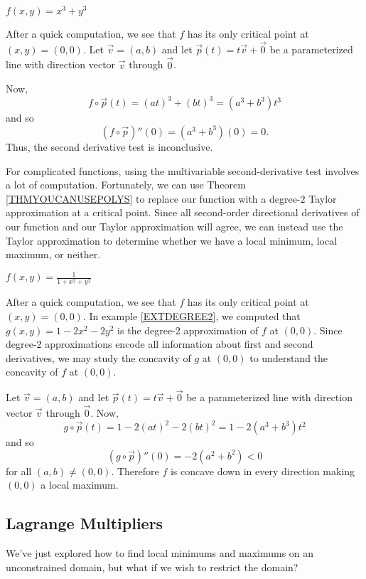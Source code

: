 \begin{example}
	$f(x,y)=x^3+y^3$

	After a quick computation, we see that $f$ has its only critical
	point at $(x,y)=(0,0)$.  Let $\vec v=(a,b)$ and let $\vec p(t) = t\vec v+\vec 0$
	be a parameterized line with direction vector $\vec v$ through $\vec 0$.

	Now,
	\[
		f\circ \vec p(t) = (at)^3+(bt)^3=(a^3+b^3)t^3
	\]
	and so
	\[
		(f\circ \vec p)''(0) = (a^3+b^3)(0) = 0.
	\]
	Thus, the second derivative test is inconclusive.
\end{example}

For complicated functions, using the multivariable second-derivative test
involves a lot of computation.  Fortunately, we can use Theorem \ref{THMYOUCANUSEPOLYS}
to replace our function with a degree-$2$ Taylor approximation at a critical point.  
Since all second-order directional derivatives of our function and our Taylor approximation
will agree, we can instead use the Taylor approximation to determine whether we have a local
minimum, local maximum, or neither. 

\begin{example}
	$f(x,y)=\frac{1}{1+x^2+y^2}$

	After a quick computation, we see that $f$ has its only critical
	point at $(x,y)=(0,0)$.  
	In example \ref{EXTDEGREE2}, we computed that
	$g(x,y)=1-2x^2-2y^2$ is the degree-2 approximation of $f$ at $(0,0)$.  Since
	degree-2 approximations encode all information about first and second derivatives,
	we may study the concavity of $g$ at $(0,0)$ to understand the concavity of $f$ at $(0,0)$.

	Let $\vec v=(a,b)$ and let $\vec p(t) = t\vec v+\vec 0$
	be a parameterized line with direction vector $\vec v$ through $\vec 0$.  Now,
	\[
		g\circ \vec p(t) = 1-2(at)^2-2(bt)^2=1-2(a^3+b^3)t^2
	\]
	and so
	\[
		(g\circ \vec p)''(0) = -2(a^2+b^2) < 0
	\]
	for all $(a,b)\neq (0,0)$.  Therefore $f$ is concave down in every direction
	making $(0,0)$ a local maximum.
\end{example}


\subsection{Lagrange Multipliers}

We've just explored how to find local minimums and maximums on an unconstrained domain,
but what if we wish to restrict the domain?

